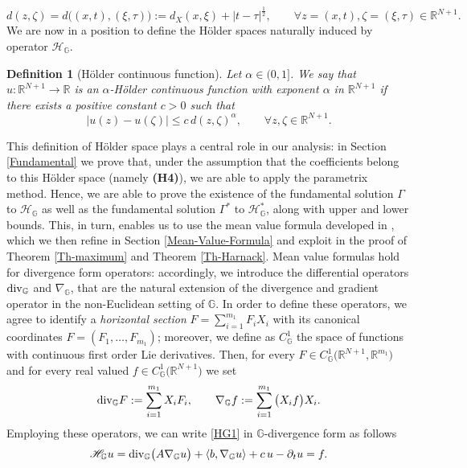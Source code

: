 \documentclass[11pt,a4paper]{article}
\newtheorem{definition}[theorem]{\bf Definition}
\numberwithin{equation}{section}
\newcommand{\R}{\mathbb{R}}
\def \rnn {{\mathbb {R}}^{N+1}}
\def \GG {{\mathbb{G}}}
\def \div {{\text{\rm div}}}
\def \p {\partial}
\def \H {\mathscr{H}_\GG}
\def \HH{\mathscr{H}_\GG^*}
\def \a {{\alpha}}
\def \G {{\Gamma}}
\def \t {{\tau}}
\def \x {{\xi}}
\def \z {{\zeta}}
\begin{document}
\begin{equation}\label{GG-distance}
	d(z,\z)=d\big((x,t),(\x,\t)\big):=d_X(x,\x)+ |t-\t|^\frac{1}{2},\qquad \forall z=(x,t),\z=(\x,\t)\in\rnn.
\end{equation}
We are now in a position to define the Hölder spaces naturally induced by operator $\H$.
\begin{definition}[H\"older continuous function]\label{H\"older continuous function}
	Let $\a \in (0,1]$. We say that  $u:\rnn\rightarrow \R$ is an $\a$-H\"older continuous function with exponent $\a$ in $\rnn$ if there exists a positive constant $c>0$ such that 
	\begin{equation}
		\left|u(z)-u(\z)\right|\leq c\,d(z,\z)^\a,\qquad \forall z,\z \in \rnn.
	\end{equation}
\end{definition}
This definition of H\"older space plays a central role in our analysis: in Section \ref{Fundamental} we prove that, under the assumption that the coefficients belong to this H\"older space (namely \textbf{(H4)}), we are able to apply the parametrix method. Hence, we are able to prove the existence of the fundamental solution $\G$ to $\H$ as well as the fundamental solution $\G^*$ to $\HH$, along with upper and lower bounds. This, in turn, enables us to use the mean value formula developed in \cite{pallara2023meanvalueformulasclassical}, which we then refine in Section \ref{Mean-Value-Formula} and exploit in the proof of Theorem \ref{Th-maximum} and Theorem \ref{Th-Harnack}. Mean value formulas hold for divergence form operators: accordingly, we introduce the differential operators $\div _{\GG}$ and $\nabla _{\GG}$, that are the natural extension of the divergence and gradient operator in the non-Euclidean setting of $\GG$. In order to define these operators, we agree to identify a \emph{horizontal section} $F =\sum_{i=1}^{m_1} F_i X_i$ with its canonical coordinates $F =(F_1,\ldots,F_{m_1})$; moreover, we define as $C^1_{\GG}$ the space of functions with continuous first order Lie derivatives. Then, for every $F \in C^1_{\GG}\big(\rnn,\R^{m_1}\big)$  and for every real valued $f \in C^1_{\GG}\big(\rnn\big)$ we set 
\begin{equation}\label{divG}
	\div_{\GG}F:= \sum_{i=1}^{m_1} X_i F_i,\qquad \nabla_{\GG}f:=\sum_{i=1}^{m_1} \big(X_i f\big)X_i.
\end{equation}
Employing these operators, we can write \eqref{HG1} in $\GG$-divergence form as follows
\begin{equation}\label{HG1-div}
	\H u =\div_\GG \big(A\nabla_\GG u\big)+ \langle b,\nabla_\GG u\rangle + c\,u-\p_t u=f.
\end{equation}
\end{document}
